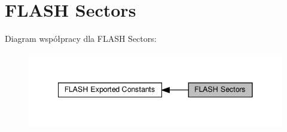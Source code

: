 \hypertarget{group___f_l_a_s_h_ex___sectors}{}\section{F\+L\+A\+SH Sectors}
\label{group___f_l_a_s_h_ex___sectors}
Diagram współpracy dla F\+L\+A\+SH Sectors\+:\nopagebreak
\begin{figure}[H]
\begin{center}
\leavevmode
\includegraphics[width=341pt]{group___f_l_a_s_h_ex___sectors}
\end{center}
\end{figure}
